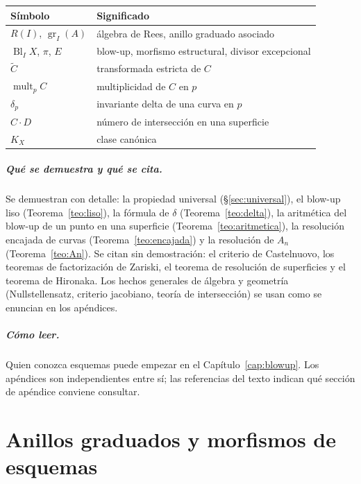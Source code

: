 \documentclass[11pt,a4paper,oneside]{book}
\newcommand{\Bl}{\operatorname{Bl}}
\newcommand{\gr}{\operatorname{gr}}
\newcommand{\mult}{\operatorname{mult}}
\theoremstyle{plain}
\theoremstyle{definition}
\theoremstyle{remark}
\begin{document}
\begin{center}
\begin{tabular}{@{}ll@{}}
\toprule
Símbolo & Significado \\
\midrule
$R(I)$, $\gr_I(A)$ & álgebra de Rees, anillo graduado asociado \\
$\Bl_IX$, $\pi$, $E$ & blow-up, morfismo estructural, divisor excepcional \\
$\tilde C$ & transformada estricta de $C$ \\
$\mult_pC$ & multiplicidad de $C$ en $p$ \\
$\delta_p$ & invariante delta de una curva en $p$ \\
$C\cdot D$ & número de intersección en una superficie \\
$K_X$ & clase canónica \\
\bottomrule
\end{tabular}
\end{center}

\paragraph{Qué se demuestra y qué se cita.} Se demuestran con detalle: la propiedad universal (\S\ref{sec:universal}), el blow-up liso (Teorema~\ref{teo:liso}), la fórmula de $\delta$ (Teorema~\ref{teo:delta}), la aritmética del blow-up de un punto en una superficie (Teorema~\ref{teo:aritmetica}), la resolución encajada de curvas (Teorema~\ref{teo:encajada}) y la resolución de $A_n$ (Teorema~\ref{teo:An}). Se citan sin demostración: el criterio de Castelnuovo, los teoremas de factorización de Zariski, el teorema de resolución de superficies y el teorema de Hironaka. Los hechos generales de álgebra y geometría (Nullstellensatz, criterio jacobiano, teoría de intersección) se usan como se enuncian en los apéndices.

\paragraph{Cómo leer.} Quien conozca esquemas puede empezar en el Capítulo~\ref{cap:blowup}. Los apéndices son independientes entre sí; las referencias del texto indican qué sección de apéndice conviene consultar.

\chapter{Anillos graduados y morfismos de esquemas}\label{cap:prelim}
\end{document}
